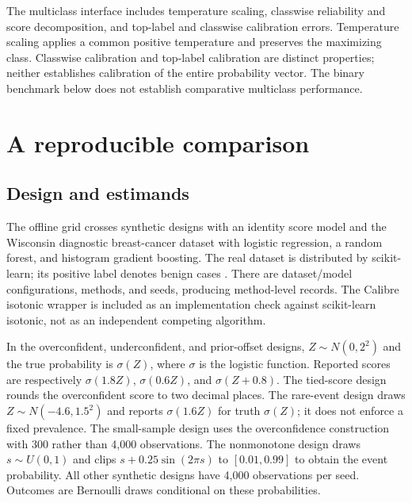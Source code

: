 \documentclass[11pt]{article}
\begin{document}
The multiclass interface includes temperature scaling, classwise reliability and score decomposition, and top-label and classwise calibration errors. Temperature scaling applies a common positive temperature and preserves the maximizing class. Classwise calibration and top-label calibration are distinct properties; neither establishes calibration of the entire probability vector. The binary benchmark below does not establish comparative multiclass performance.

\section{A reproducible comparison}
\label{sec:benchmark}

\subsection{Design and estimands}

The offline grid crosses \BenchSynthetic{} synthetic designs with an identity score model and the Wisconsin diagnostic breast-cancer dataset with logistic regression, a random forest, and histogram gradient boosting. The real dataset is distributed by scikit-learn; its positive label denotes benign cases \citep{breastcancer}. There are \BenchCells{} dataset/model configurations, \BenchMethods{} methods, and \BenchSeeds{} seeds, producing \BenchRows{} method-level records. The Calibre isotonic wrapper is included as an implementation check against scikit-learn isotonic, not as an independent competing algorithm.

In the overconfident, underconfident, and prior-offset designs, $Z\sim N(0,2^2)$ and the true probability is $\sigma(Z)$, where $\sigma$ is the logistic function. Reported scores are respectively $\sigma(1.8Z)$, $\sigma(0.6Z)$, and $\sigma(Z+0.8)$. The tied-score design rounds the overconfident score to two decimal places. The rare-event design draws $Z\sim N(-4.6,1.5^2)$ and reports $\sigma(1.6Z)$ for truth $\sigma(Z)$; it does not enforce a fixed prevalence. The small-sample design uses the overconfidence construction with 300 rather than 4,000 observations. The nonmonotone design draws $s\sim U(0,1)$ and clips $s+0.25\sin(2\pi s)$ to $[0.01,0.99]$ to obtain the event probability. All other synthetic designs have 4,000 observations per seed. Outcomes are Bernoulli draws conditional on these probabilities.
\end{document}
